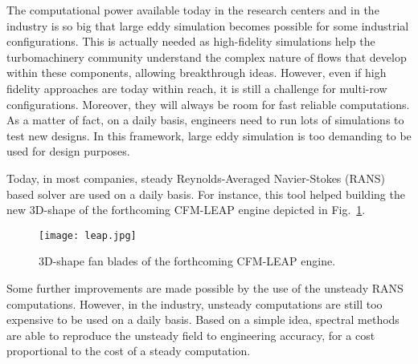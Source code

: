 
The computational power available today in
the research centers and in the industry
is so big that large eddy simulation
becomes possible for some industrial configurations.
This is actually needed as high-fidelity
simulations help the turbomachinery community understand
the complex nature of flows that develop 
within these components,
allowing breakthrough ideas.
However, even if high fidelity approaches
are today within reach, it is still a challenge for
multi-row configurations.
Moreover, they will always be room for fast reliable
computations. 
As a matter of fact, on a daily basis, engineers need
to run lots of simulations to test new designs.
In this framework, large eddy simulation is
too demanding to be used for design purposes.

Today, in most companies, steady Reynolds-Averaged
Navier-Stokes (RANS) based solver are used on a daily basis.
For instance, this tool 
helped building the new $3$D-shape
of the forthcoming CFM-LEAP engine
depicted in Fig.~\ref{fig:sm_leap}.
\begin{figure}[htbp]
  \centering
  \texttt{[image: leap.jpg]}
  \caption{$3$D-shape fan blades of the forthcoming CFM-LEAP engine.}
  \label{fig:sm_leap}
\end{figure}
Some further improvements are made possible by the use
of the unsteady RANS computations.
However, in the industry, unsteady computations
are still too expensive to be used on a daily basis.
Based on a simple idea, spectral methods are 
able to reproduce the unsteady field to engineering
accuracy, for a cost proportional to the cost of a
steady computation.

